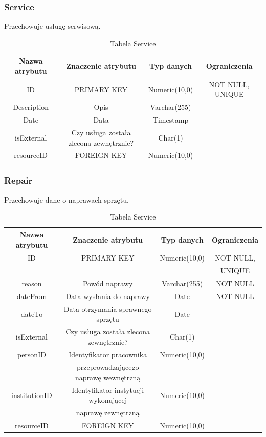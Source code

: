 \subsubsection{Service}
Przechowuje usługę serwisową.
\begin{table}[H]
	\renewcommand\arraystretch{1.5}
	\renewcommand\tabcolsep{1pt}
	\begin{tabular}{| c | c | c | c |} 
	\hline \textbf{Nazwa atrybutu} & \textbf{Znaczenie atrybutu} & \textbf{Typ danych} & \textbf{Ograniczenia} \\ 
	\hline ID & PRIMARY KEY & Numeric(10,0) & NOT NULL, UNIQUE \\ 
	\hline Description & Opis & Varchar(255) & \\ 
	\hline Date & Data & Timestamp &  \\ 
	\hline isExternal & Czy usługa została zlecona zewnętrznie? & Char(1) & \\ 
	\hline resourceID & FOREIGN KEY & Numeric(10,0) & \\ 
	\hline 
\end{tabular}
\caption{Tabela Service}
\label{TAB:Service}
\end{table} 

\subsubsection{Repair}
Przechowuje dane o naprawach sprzętu.
\begin{table}[H]
	\renewcommand\arraystretch{1.5}
	\renewcommand\tabcolsep{1pt}
	\begin{tabular}{| c | c | c | c |} 
		\hline \textbf{Nazwa atrybutu} & \textbf{Znaczenie atrybutu} & \textbf{Typ danych} & \textbf{Ograniczenia} \\ 
		\hline ID & PRIMARY KEY & Numeric(10,0) & NOT NULL, \\ 
		 & & &  UNIQUE \\
		\hline reason & Powód naprawy & Varchar(255) & NOT NULL\\ 
		\hline dateFrom & Data wysłania do naprawy & Date & NOT NULL \\ 
		\hline dateTo & Data otrzymania sprawnego sprzętu & Date & \\ 
		\hline isExternal & Czy usługa została zlecona zewnętrznie? & Char(1) & \\ 
		\hline personID & Identyfikator pracownika & Numeric(10,0) & \\ 
		& przeprowadzającego naprawę wewnętrzną & & \\
		\hline institutionID & Identyfikator instytucji wykonującej & Numeric(10,0) & \\ 
		&  naprawę zewnętrzną & & \\
		\hline resourceID & FOREIGN KEY & Numeric(10,0) & \\ 
		\hline 
	\end{tabular}
	\caption{Tabela Service}
	\label{TAB:Service}
\end{table} 

